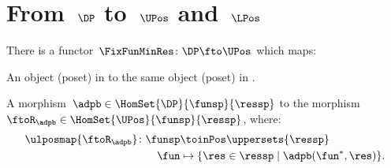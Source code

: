   

\section{From~$\DP$ to~$\UPos$ and~$\LPos$}
\begin{lemma}
\label{lem:covfunctor}
There is a functor~$\FixFunMinRes\colon \DP \fto \UPos$ which maps:
\begin{compactenum}
\item An object (poset) in \DP to the same object (poset) in \UPos.
\item A morphism~$\adpb\in \HomSet{\DP}{\funsp}{\ressp}$ to the morphism~$\ftoR_{\adpb}\in \HomSet{\UPos}{\funsp}{\ressp}$, where:
\begin{equation}
\begin{aligned}
    \ulposmap{\ftoR_{\adpb}}\colon \funsp &\toinPos \uppersets{\ressp}\\
    \fun&\mapsto \{\res \in \ressp\mid \adpb(\fun^*,\res)\}.
\end{aligned}
\end{equation}
\end{compactenum}
\end{lemma}

